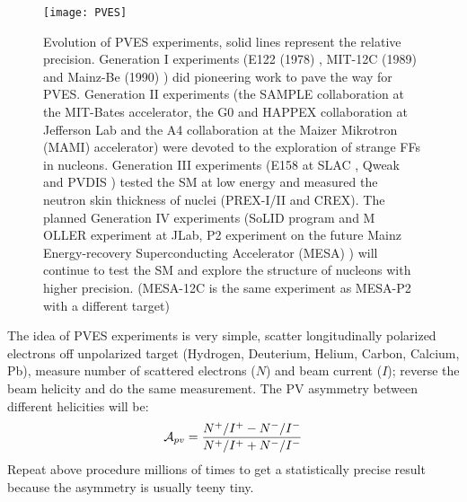 \begin{figure}[h!]
    \centering
    \texttt{[image: PVES]}
    \caption{Evolution of PVES experiments, solid lines represent the relative 
    precision. Generation I experiments (E122 (1978) \cite{PRESCOTT1978347}, 
    MIT-12C (1989) \cite{PhysRevLett.65.694} and Mainz-Be (1990) \cite{HEIL19891}) 
    did pioneering work to pave the way for PVES. Generation II experiments
    (the SAMPLE collaboration \cite{SAMPLE} at the MIT-Bates accelerator, 
    the G0 \cite{G0} and HAPPEX \cite{HAPPEX} collaboration at Jefferson Lab and
    the A4 collaboration \cite{A4} at the Maizer Mikrotron (MAMI) accelerator) 
    were devoted to the exploration of strange FFs in nucleons.
    Generation III experiments (E158 at SLAC \cite{PhysRevLett.95.081601}, 
    Qweak \cite{PhysRevLett.111.141803} and PVDIS \cite{PhysRevLett.111.082501})
    tested the SM at low energy and measured the neutron skin thickness of nuclei
    (PREX-I/II and CREX). The planned Generation IV experiments (SoLID program \cite{SoLID}
    and M\\OLLER experiment \cite{Moller} at JLab, P2 experiment on the future
    Mainz Energy-recovery Superconducting Accelerator (MESA) \cite{MESA-P2})
    will continue to test the SM and explore the structure of nucleons with higher precision.
    (MESA-12C is the same experiment as MESA-P2 with a different \C target) }
\end{figure}

The idea of PVES experiments is very simple, scatter longitudinally polarized
electrons off unpolarized target (Hydrogen, Deuterium, Helium, Carbon, Calcium, Pb),
measure number of scattered electrons ($N$) and beam current ($I$); reverse the beam helicity 
and do the same measurement. The PV asymmetry between different helicities will be:
\begin{equation}
    \mathcal{A}_{pv} = \frac{N^+/I^+ - N^-/I^-}{N^+/I^+ + N^-/I^-}
\end{equation}
Repeat above procedure millions of times to get a statistically precise result
because the asymmetry is usually teeny tiny.

